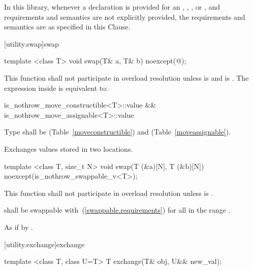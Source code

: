 \pnum
In this library, whenever a declaration is provided for an ,
, , or ,
and requirements and semantics are not explicitly provided,
the requirements and semantics are as specified in this Clause.

[utility.swap]{swap}

%
\begin{itemdecl}
template <class T> void swap(T& a, T& b) noexcept(@\seebelow@);
\end{itemdecl}

\begin{itemdescr}
\pnum
\remarks This function shall not participate in overload resolution
unless  is  and
 is .
The expression inside  is equivalent to:

\begin{codeblock}
is_nothrow_move_constructible<T>::value &&
is_nothrow_move_assignable<T>::value
\end{codeblock}

\pnum
\requires
Type
shall be
 (Table~\ref{moveconstructible})
and
 (Table~\ref{moveassignable}).

\pnum
\effects
Exchanges values stored in two locations.
\end{itemdescr}

%
\begin{itemdecl}
template <class T, size_t N>
  void swap(T (&a)[N], T (&b)[N]) noexcept(is_nothrow_swappable_v<T>);
\end{itemdecl}

\begin{itemdescr}
\pnum
\remarks
This function shall not participate in overload resolution
unless  is .

\pnum
\requires
{} shall be swappable with~(\ref{swappable.requirements}) 
for all  in the range .

\pnum
\effects As if by .
\end{itemdescr}

[utility.exchange]{exchange}

\begin{itemdecl}
template <class T, class U=T> T exchange(T& obj, U&& new_val);
\end{itemdecl}

